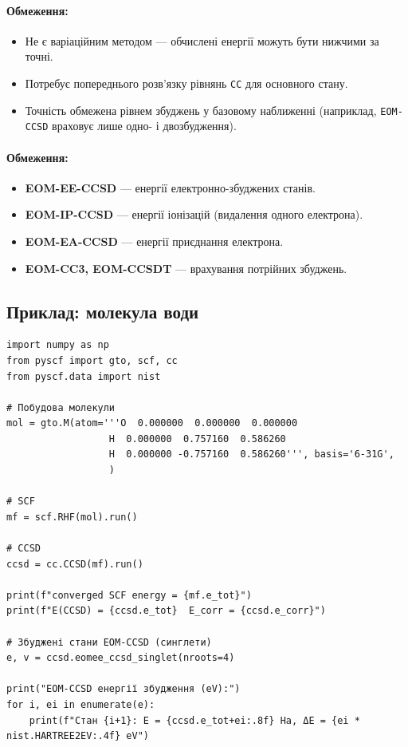 \paragraph{Обмеження:}
\begin{itemize}
    \item Не є варіаційним методом --- обчислені енергії можуть бути нижчими за точні.
    \item Потребує попереднього розв’язку рівнянь \texttt{CC} для основного стану.
    \item Точність обмежена рівнем збуджень у базовому наближенні
          (наприклад, \texttt{EOM-CCSD} враховує лише одно- і двозбудження).
\end{itemize}

\paragraph{Обмеження:}

\begin{itemize}
    \item \textbf{EOM-EE-CCSD} --- енергії електронно-збуджених станів.
    \item \textbf{EOM-IP-CCSD} --- енергії іонізацій (видалення одного електрона).
    \item \textbf{EOM-EA-CCSD} --- енергії приєднання електрона.
    \item \textbf{EOM-CC3, EOM-CCSDT} --- врахування потрійних збуджень.
\end{itemize}


\subsection{Приклад: молекула води}

\begin{verbatim}
import numpy as np
from pyscf import gto, scf, cc
from pyscf.data import nist

# Побудова молекули
mol = gto.M(atom='''O  0.000000  0.000000  0.000000
                  H  0.000000  0.757160  0.586260
                  H  0.000000 -0.757160  0.586260''', basis='6-31G',
                  )

# SCF
mf = scf.RHF(mol).run()

# CCSD
ccsd = cc.CCSD(mf).run()

print(f"converged SCF energy = {mf.e_tot}")
print(f"E(CCSD) = {ccsd.e_tot}  E_corr = {ccsd.e_corr}")

# Збуджені стани EOM-CCSD (синглети)
e, v = ccsd.eomee_ccsd_singlet(nroots=4)

print("EOM-CCSD енергії збудження (eV):")
for i, ei in enumerate(e):
    print(f"Стан {i+1}: E = {ccsd.e_tot+ei:.8f} Ha, ΔE = {ei * nist.HARTREE2EV:.4f} eV")
\end{verbatim}

